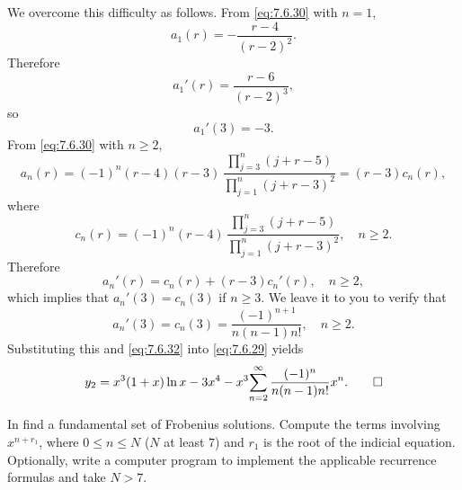 \begin{solution}
We  overcome this difficulty as follows. From \eqref{eq:7.6.30} with
$n=1$,
\[
a_1(r)=-\frac{r-4}{(r-2)^2}.
\]
Therefore
\[
a_1'(r)=\frac{r-6}{(r-2)^3},
\]
so
\begin{equation} \label{eq:7.6.32}
a_1'(3)=-3.
\end{equation}
From \eqref{eq:7.6.30} with $n\ge2$,
\[
a_n(r)=(-1)^n (r-4)(r-3)\,\frac{\prod_{j=3}^n(j+r-5)}{\prod_{j=1}^n(j+r-3)^2}
=(r-3)c_n(r),
\]
where
\[
c_n(r)=(-1)^n(r-4)\,
\frac{\prod_{j=3}^n(j+r-5)}{\prod_{j=1}^n(j+r-3)^2},\quad  n\ge2.
\]
Therefore
\[
a_n'(r)=c_n(r)+(r-3)c_n'(r),\quad n\ge2,
\]
which implies that  $a_n'(3)=c_n(3)$ if $n\ge3$. We leave it to
you to verify that
\[
a_n'(3)=c_n(3)=\frac{(-1)^{n+1}}{n(n-1)n!},\quad n\ge2.
\]
Substituting this and \eqref{eq:7.6.32} into \eqref{eq:7.6.29}
yields
\[
y_2=x^3(1+x)\ln x-3x^4-x^3\displaystyle{\sum_{n=2}^\infty\frac{(-1)^n}{n(n-1)n!}x^n}.
\qedhere
\]
\end{solution}

\exercises
In  find a fundamental set of
Frobenius solutions.
Compute  the terms involving $x^{n+r_1}$,
where $0\le n\le N$ ($N$ at least $7$) and $r_1$ is the root of the
indicial equation.
 Optionally, write a computer program to implement the applicable
recurrence formulas and take $N>7$.

